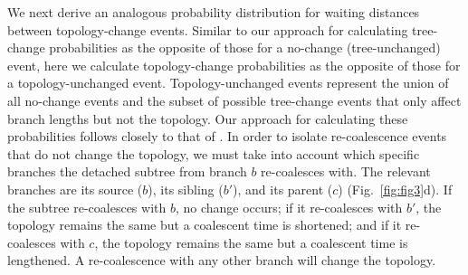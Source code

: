 \documentclass[11pt]{article}
\begin{document}
We next derive an analogous probability distribution for waiting distances 
between topology-change events.
Similar to our approach for calculating tree-change probabilities as the opposite of those for a 
no-change (tree-unchanged) event, here we calculate topology-change probabilities as the 
opposite of those for a topology-unchanged event. Topology-unchanged events represent the union of 
all no-change events and the subset of possible tree-change events 
that only affect branch lengths but not the topology. 
Our approach for calculating these probabilities follows closely to that of \citet{deng_distribution_2021}.
In order to isolate re-coalescence events that do not change the topology,
we must take into account which specific branches the detached subtree from 
branch $b$ re-coalesces with. The relevant branches are its source ($b$), 
its sibling ($b'$), and its parent ($c$) (Fig.~\ref{fig:fig3}d). 
If the subtree re-coalesces with $b$, no change occurs; if it re-coalesces
with $b'$, the topology remains the same but a coalescent time is shortened;
and if it re-coalesces with $c$, the topology remains the same but a coalescent 
time is lengthened. A re-coalescence with any other branch will change the topology.







\end{document}
